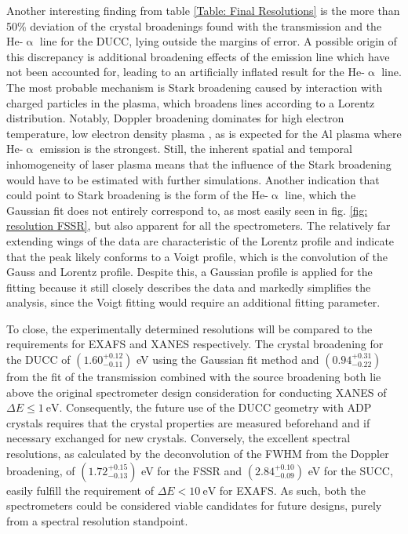Another interesting finding from table \ref{Table: Final Resolutions} is the more than 50\% deviation of the crystal broadenings found with the transmission and the He-$\upalpha$ line for the DUCC, lying outside the margins of error. A possible origin of this discrepancy is additional broadening effects of the emission line which have not been accounted for, leading to an artificially inflated result for the He-$\upalpha$ line. The most probable mechanism is Stark broadening caused by interaction with charged particles in the plasma, which broadens lines according to a Lorentz distribution. Notably, Doppler broadening dominates for high electron temperature, low electron density plasma \citep{wiese1965plasma}, as is expected for the Al plasma where He-$\upalpha$ emission is the strongest. Still, the inherent spatial and temporal inhomogeneity of laser plasma means that the influence of the Stark broadening would have to be estimated with further simulations. Another indication that could point to Stark broadening is the form of the He-$\upalpha$ line, which the Gaussian fit does not entirely correspond to, as most easily seen in fig. \ref{fig: resolution FSSR}, but also apparent for all the spectrometers. The relatively far extending wings of the data are characteristic of the Lorentz profile \citep{kunze2009introduction} and indicate that the peak likely conforms to a Voigt profile, which is the convolution of the Gauss and Lorentz profile. Despite this, a Gaussian profile is applied for the fitting because it still closely describes the data and markedly simplifies the analysis, since the Voigt fitting would require an additional fitting parameter.

To close, the experimentally determined resolutions will be compared to the requirements for EXAFS and XANES respectively. The crystal broadening for the DUCC of $\left(1.60^{+0.12}_{-0.11}\right)$ eV using the Gaussian fit method and $\left(0.94^{+0.31}_{-0.22}\right)$ from the fit of the transmission combined with the source broadening both lie above the original spectrometer design consideration for conducting XANES of $\Delta E \leq\SI{1}{\electronvolt}$. Consequently, the future use of the DUCC geometry with ADP crystals requires that the crystal properties are measured beforehand and if necessary exchanged for new crystals. Conversely, the excellent spectral resolutions, as calculated by the deconvolution of the FWHM from the Doppler broadening, of $\left(1.72^{+0.15}_{-0.13}\right)$ eV for the FSSR and $\left(2.84^{+0.10}_{-0.09}\right)$ eV for the SUCC, easily fulfill the requirement of $\Delta E <\SI{10}{\electronvolt}$ for EXAFS. As such, both the spectrometers could be considered viable candidates for future designs, purely from a spectral resolution standpoint.


